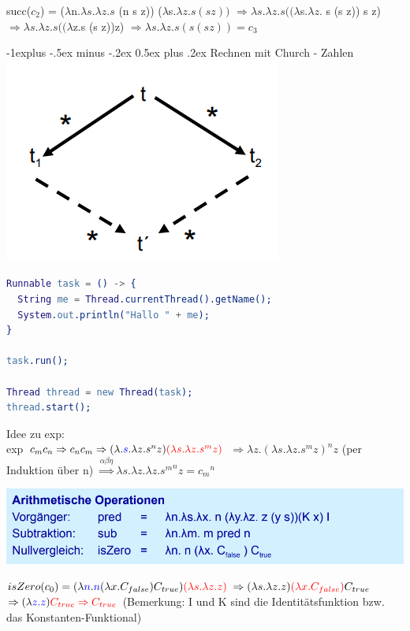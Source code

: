 \documentclass[10pt]{article}
\makeatletter
\renewcommand{\subsection}{\@startsection{subsection}{2}{0mm}%
                                {-1explus -.5ex minus -.2ex}%
                                {0.5ex plus .2ex}%
                                {\normalfont\normalsize\bfseries}}
\makeatother
\begin{document}
succ($c_2$) = ($\lambda$\color{blue}n\color{black}.$\lambda s.\lambda z.s$ (\color{blue}n\color{black} s z)) \color{red} ($\lambda$s.$\lambda z.s (s z))$ \color{black}
\subitem $\Rightarrow\lambda s.\lambda z.s ((\lambda$\color{blue}s\color{black}.$\lambda z.$ \color{blue} s \color{black}(\color{blue}s\color{black} z)) s z)
\subitem $\Rightarrow\lambda s.\lambda z.s((\lambda$\color{blue}z\color{black}.s (s \color{blue}z\color{black}))\color{red}z\color{black})
\subitem $\Rightarrow\lambda s.\lambda z.s(s(s z)) = c_3$

\subsection{Rechnen mit Church - Zahlen }
\includegraphics[width=0.4\linewidth]{Assets/Programmierparadigmen-diamant-eigenschaft}
\begin{lstlisting}[language=erlang]
Runnable task = () -> {
  String me = Thread.currentThread().getName();
  System.out.println("Hallo " + me);
}

task.run();

Thread thread = new Thread(task);
thread.start();
\end{lstlisting}

Idee zu exp: \\
\subitem exp $c_m c_n \Rightarrow c_n c_m \Rightarrow (\lambda.\color{blue}s\color{black}.\lambda z.s^n z)\color{red}(\lambda s. \lambda z.s^m z)$ \color{black}
\subsubitem $\Rightarrow \lambda z.(\lambda s. \lambda z.s^m z)^n z$
\subitem (per Induktion über n) $\stackrel{\alpha \beta \eta}{\Rightarrow}\lambda s.\lambda z. \lambda z.{s^m}^n z = {c_m}^n$

\begin{center}
  \includegraphics[width=0.4\linewidth]{Assets/Programmierparadigmen-Arithmetische-Operationen}
\end{center}

\subitem $isZero(c_0) = (\lambda\color{blue}n\color{black}.\color{blue}n\color{black}(\lambda x.C_{false})C_{true})\color{red} (\lambda s.\lambda z.z)\color{black}$
\subsubitem $\Rightarrow (\lambda s. \lambda z. z)\color{red} (\lambda x.C_{false})\color{black} C_{true}$
\subsubitem $\Rightarrow (\lambda \color{blue} z.z \color{black}) \color{red} C_{true} \Rightarrow C_{true}$
(Bemerkung: I und K sind die Identitätsfunktion bzw. das Konstanten-Funktional)
\end{document}

